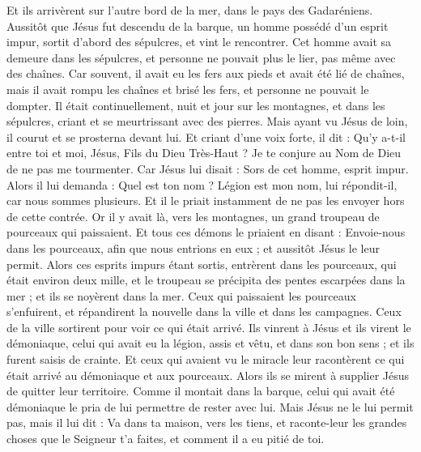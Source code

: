 \begin{multicols}{2}
\VerseOne{}Et ils arrivèrent sur l'autre bord de la mer, dans le pays des Gadaréniens.
Aussitôt que Jésus fut descendu de la barque, un homme possédé d'un esprit impur, sortit d'abord des sépulcres, et vint le rencontrer.
Cet homme avait sa demeure dans les sépulcres, et personne ne pouvait plus le lier, pas même avec des chaînes.
Car souvent, il avait eu les fers aux pieds et avait été lié de chaînes, mais il avait rompu les chaînes et brisé les fers, et personne ne pouvait le dompter.
Il était continuellement, nuit et jour sur les montagnes, et dans les sépulcres, criant et se meurtrissant avec des pierres.
Mais ayant vu Jésus de loin, il courut et se prosterna devant lui.
Et criant d'une voix forte, il dit : Qu'y a-t-il entre toi et moi, Jésus, Fils du Dieu Très-Haut ? Je te conjure au Nom de Dieu de ne pas me tourmenter.
Car Jésus lui disait : Sors de cet homme, esprit impur.
Alors il lui demanda : Quel est ton nom ? Légion est mon nom, lui répondit-il, car nous sommes plusieurs.
Et il le priait instamment de ne pas les envoyer hors de cette contrée.
Or il y avait là, vers les montagnes, un grand troupeau de pourceaux qui paissaient.
Et tous ces démons le priaient en disant : Envoie-nous dans les pourceaux, afin que nous entrions en eux ;
et aussitôt Jésus le leur permit. Alors ces esprits impurs étant sortis, entrèrent dans les pourceaux, qui était environ deux mille, et le troupeau se précipita des pentes escarpées dans la mer ; et ils se noyèrent dans la mer.
Ceux qui paissaient les pourceaux s'enfuirent, et répandirent la nouvelle dans la ville et dans les campagnes. Ceux de la ville sortirent pour voir ce qui était arrivé.
Ils vinrent à Jésus et ils virent le démoniaque, celui qui avait eu la légion, assis et vêtu, et dans son bon sens ; et ils furent saisis de crainte.
Et ceux qui avaient vu le miracle leur racontèrent ce qui était arrivé au démoniaque et aux pourceaux.
Alors ils se mirent à supplier Jésus de quitter leur territoire.
Comme il montait dans la barque, celui qui avait été démoniaque le pria de lui permettre de rester avec lui.
Mais Jésus ne le lui permit pas, mais il lui dit : Va dans ta maison, vers les tiens, et raconte-leur les grandes choses que le Seigneur t'a faites, et comment il a eu pitié de toi.

\end{multicols}
